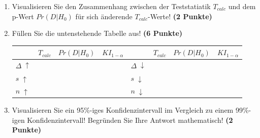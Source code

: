 \documentclass[a4paper, 9pt]{scrartcl}\usepackage[]{graphicx}\usepackage[]{xcolor}
\begin{document}
\begin{enumerate}
\item Visualisieren Sie den Zusammenhang zwischen der Teststatiatik
  $T_{calc}$ und dem p-Wert $Pr(D|H_0)$ f{\"u}r sich {\"a}nderende $T_{calc}$-Werte!
  \textbf{(2 Punkte)}  
\item  F{\"u}llen Sie die untenstehende Tabelle aus! \textbf{(6 Punkte)}
\begin{center}
  \large
  \begin{tabular}[c]{l|c|c|c|l|c|c|c}
    & $T_{calc}$ & $Pr(D|H_0)$ & $KI_{1-\alpha}$ & & $T_{calc}$ & $Pr(D|H_0)$ & $KI_{1-\alpha}$\strut\\ 
    \hline
    \textbf{$\Delta\; \uparrow$} & \hspace{1.8cm} & \hspace{1.8cm}  & \hspace{1.8cm} & \textbf{
                                                          $\Delta\; \downarrow$} &
                                                                          \hspace{1.8cm} & \hspace{1.8cm}  & \hspace{1.8cm}\strut\\
    \hline
        \textbf{$s\; \uparrow$} & \hspace{1.8cm} & \hspace{1.8cm}  & \hspace{1.8cm} & \textbf{
                                                          $s\; \downarrow$} &
                                                                          \hspace{1.8cm}
                                                & \hspace{1.8cm}  & \hspace{1.8cm}\strut\\
    \hline
        \textbf{$n\; \uparrow$} & \hspace{1.8cm} & \hspace{1.8cm}  & \hspace{1.8cm} & \textbf{
                                                          $n\; \downarrow$} &
                                                                          \hspace{1.8cm}
                                                & \hspace{1.8cm}  & \hspace{1.8cm}\strut\\
    \hline
  \end{tabular}
\end{center}
\item Visualisieren Sie ein 95\%-iges Konfidenzintervall im Vergleich
  zu einem 99\%-igen Konfidenzintervall! Begr{\"u}nden Sie Ihre Antwort mathematisch! \textbf{(2 Punkte)} 
\end{enumerate} 
\end{document}
